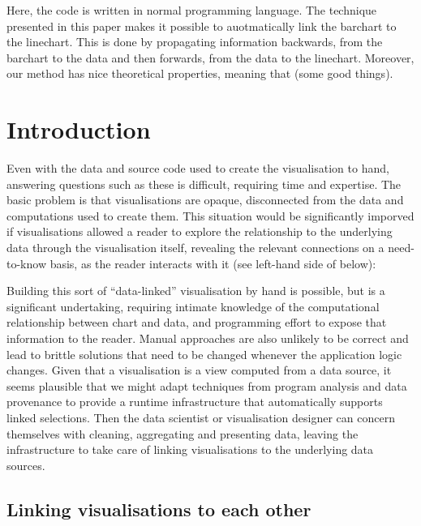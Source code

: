 Here, the code is written in normal programming language. The technique presented in this paper makes it possible to auotmatically link the barchart to the linechart. This is done by propagating information backwards, from the barchart to the data and then forwards, from the data to the linechart. Moreover, our method has nice theoretical properties, meaning that (some good things).

\section{Introduction}

\noindent Even with the data and source code used to create the visualisation to hand, answering questions such as these is difficult, requiring time and expertise. The basic problem is that visualisations are opaque, disconnected from the data and computations used to create them. This situation would be significantly imporved if visualisations allowed a reader to explore the relationship to the underlying data through the visualisation itself, revealing the relevant connections on a need-to-know basis, as the reader interacts with it (see left-hand side of  below):

Building this sort of ``data-linked'' visualisation by hand is possible, but is a significant undertaking, requiring intimate knowledge of the computational relationship between chart and data, and programming effort to expose that information to the reader. Manual approaches are also unlikely to be correct and lead to brittle solutions that need to be changed whenever the application logic changes. Given that a visualisation is a view computed from a data source, it seems plausible that we might adapt techniques from program analysis and data provenance to provide a runtime infrastructure that automatically supports linked selections. Then the data scientist or visualisation designer can concern themselves with cleaning, aggregating and presenting data, leaving the infrastructure to take care of linking visualisations to the underlying data sources.

\subsection{Linking visualisations to each other}

